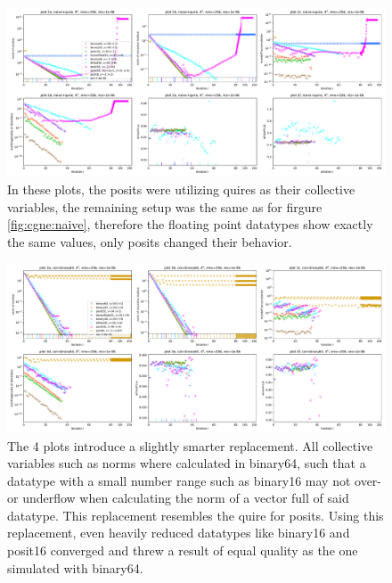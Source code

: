 \documentclass{article}
\theoremstyle{plain} %
\theoremstyle{remark} %
\numberwithin{equation}{section}
\begin{document}
\begin{figure}
    \centering
    \includegraphics[width=1.0\textwidth]{plots/cgne_new1}
    \caption{In these plots, the posits were utilizing \glspl{quire} as their collective variables, the remaining setup was the same as for firgure \ref{fig:cgne:naive}, therefore the floating point datatypes show exactly the same values, only posits changed their behavior.}
    \label{fig:cgne:quire}
\end{figure}

\begin{figure}
    \centering
    \includegraphics[width=1.0\textwidth]{plots/cgne_new2}
    \caption{The 4 plots introduce a slightly smarter replacement. All collective variables such as norms where calculated in \gls{binary64}, such that a datatype with a small number range such as \gls{binary16} may not over- or underflow when calculating the norm of a vector full of said datatype. This replacement resembles the \gls{quire} for posits. Using this replacement, even heavily reduced datatypes like \gls{binary16} and \gls{posit16} converged and threw a result of equal quality as the one simulated with \gls{binary64}.}
    \label{fig:cgne:col64}
\end{figure}
\end{document}
